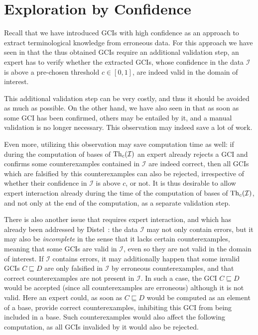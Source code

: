 \chapter{Exploration by Confidence}
\label{cha:expl-conf}

Recall that we have introduced GCIs with high confidence as an approach to extract
terminological knowledge from erroneous data.  For this approach we have seen in
 that the thus obtained GCIs require an additional validation
step, \ie an expert has to verify whether the extracted GCIs, whose confidence in the data
$\mathcal{I}$ is above a pre-chosen threshold $c \in [0,1]$, are indeed valid in the
domain of interest.

This additional validation step can be very costly, and thus it should be avoided as much
as possible.  On the other hand, we have also seen in  that as
soon as some GCI has been confirmed, others may be entailed by it, and a manual validation
is no longer necessary.  This observation may indeed save a lot of work.

Even more, utilizing this observation may save computation time as well: if during the
computation of bases of $\operatorname{Th}_c(\mathcal{I})$ an expert already rejects a GCI and confirms
some counterexamples contained in $\mathcal{I}$ are indeed correct, then all GCIs which
are falsified by this counterexamples can also be rejected, irrespective of whether their
confidence in $\mathcal{I}$ is above $c$, or not.  It is thus desirable to allow expert
interaction already during the time of the computation of bases of $\operatorname{Th}_c(\mathcal{I})$,
and not only at the end of the computation, as a separate validation step.

There is also another issue that requires expert interaction, and which has already been
addressed by Distel~\cite{Diss-Felix}: the data $\mathcal{I}$ may not only contain errors,
but it may also be \emph{incomplete} in the sense that it lacks certain counterexamples,
meaning that some GCIs are valid in $\mathcal{I}$, even so they are not valid in the
domain of interest.  If $\mathcal{I}$ contains errors, it may additionally happen that
some invalid GCIs $C \sqsubseteq D$ are only falsified in $\mathcal{I}$ by erroneous
counterexamples, and that correct counterexamples are not present in $\mathcal{I}$.  In
such a case, the GCI $C \sqsubseteq D$ would be accepted (since all counterexamples are
erroneous) although it is not valid.  Here an expert could, as soon as $C \sqsubseteq D$
would be computed as an element of a base, provide correct counterexamples, inhibiting
this GCI from being included in a base.  Such counterexamples would also affect the
following computation, as all GCIs invalided by it would also be rejected.

